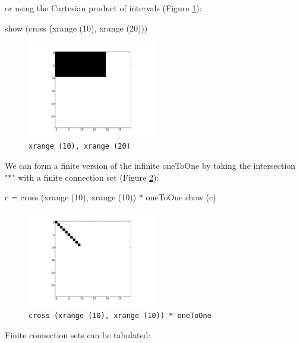 \documentclass[a4paper,twoside]{report}
\newcommand{\expr}[1]{\lstinline|#1|}
\begin{document}
or using the Cartesian product of intervals (Figure \ref{fig:cartesian}):

\begin{code}{}
  show (cross (xrange (10), xrange (20)))
\end{code}

\begin{figure}
  \begin{center}
    \includegraphics[width=0.5\textwidth]{figures/cartesian}
    \caption[Cartesian mask]{\label{fig:cartesian}
      \expr{xrange (10), xrange (20)}
    }
  \end{center}
\end{figure}
\pagebreak
We can form a finite version of the infinite oneToOne by taking the
intersection "*" with a finite connection set (Figure \ref{fig:intersection}):

\begin{code}{}
  c = cross (xrange (10), xrange (10)) * oneToOne
  show (c)
\end{code}

\begin{figure}
  \begin{center}
    \includegraphics[width=0.5\textwidth]{figures/intersection}
    \caption[Finite part of infinite set]{\label{fig:intersection}
      \expr{cross (xrange (10), xrange (10)) * oneToOne}
    }
  \end{center}
\end{figure}

Finite connection sets can be tabulated:
\end{document}
